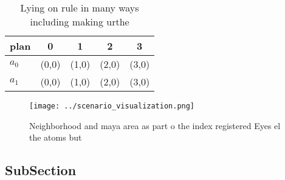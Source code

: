 \documentclass[a4paper]{article}
\begin{document}
\begin{table}
\begin{adjustbox}{width=0.7\columnwidth}
\begin{tabular}{|l|l|l|l|l|}
\hline
\textbf{plan} & \multicolumn{1}{c|}{\textbf{0}} & \multicolumn{1}{c|}{\textbf{1}} & \multicolumn{1}{c|}{\textbf{2}} & \multicolumn{1}{c|}{\textbf{3}} \\ \hline
\textbf{$a_0$}  & (0,0) & (1,0) & (2,0) & (3,0) \\ \hline
\textbf{$a_1$}  & (0,0) & (1,0) & (2,0) & (3,0) \\ \hline
\end{tabular}
\end{adjustbox}
\caption{Lying on rule in many ways including making urthe
}
\end{table}

\begin{figure}
\centering
\texttt{[image: ../scenario\_visualization.png]}
\caption{Neighborhood and maya area as part o the index registered Eyes el the atoms but
}
\end{figure}
 
\subsection{SubSection}
\end{document}

